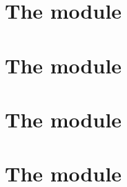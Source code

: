 

\chapter{The \shakiraMod{} module}   \label{chap: shakira data}        \minitoc 
\chapter{The \blkMdxMod{} module}    \label{chap: blake modexp data}   \minitoc 
\chapter{The \ecDataMod{} module}    \label{chap: ec data}             \minitoc 
\chapter{The \blsDataMod{} module}   \label{chap: bls data}            \minitoc 
